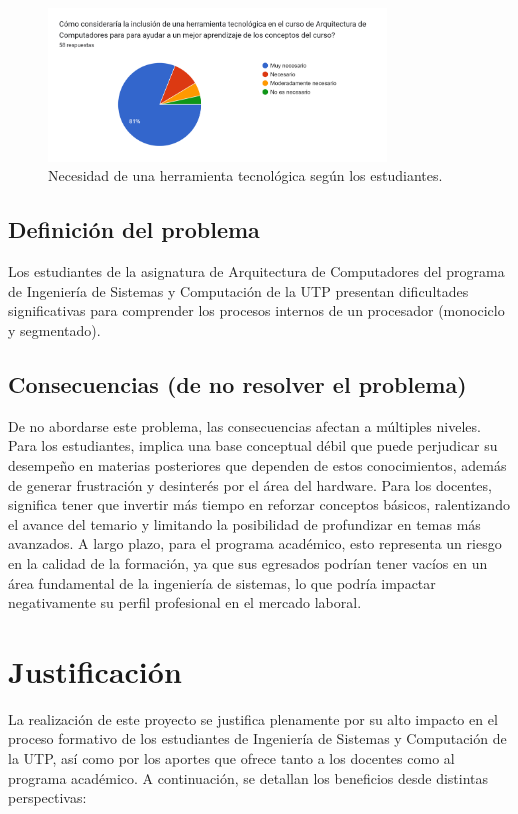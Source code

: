 \documentclass[12pt, letterpaper]{article}
\begin{document}
\begin{figure}[h!]
    \centering
    \includegraphics[width=0.8\textwidth]{figura2.png}
    \caption{Necesidad de una herramienta tecnológica según los estudiantes.}
    \label{fig:grafico2}
\end{figure}

\FloatBarrier 

\subsection{Definición del problema}
Los estudiantes de la asignatura de Arquitectura de Computadores del programa de Ingeniería de Sistemas y Computación de la UTP presentan dificultades significativas para comprender los procesos internos de un procesador (monociclo y segmentado).

\subsection{Consecuencias (de no resolver el problema)}
De no abordarse este problema, las consecuencias afectan a múltiples niveles. Para los estudiantes, implica una base conceptual débil que puede perjudicar su desempeño en materias posteriores que dependen de estos conocimientos, además de generar frustración y desinterés por el área del hardware. Para los docentes, significa tener que invertir más tiempo en reforzar conceptos básicos, ralentizando el avance del temario y limitando la posibilidad de profundizar en temas más avanzados. A largo plazo, para el programa académico, esto representa un riesgo en la calidad de la formación, ya que sus egresados podrían tener vacíos en un área fundamental de la ingeniería de sistemas, lo que podría impactar negativamente su perfil profesional en el mercado laboral.


\section{Justificación}
La realización de este proyecto se justifica plenamente por su alto impacto en el proceso formativo de los estudiantes de Ingeniería de Sistemas y Computación de la UTP, así como por los aportes que ofrece tanto a los docentes como al programa académico. A continuación, se detallan los beneficios desde distintas perspectivas:
\end{document}
